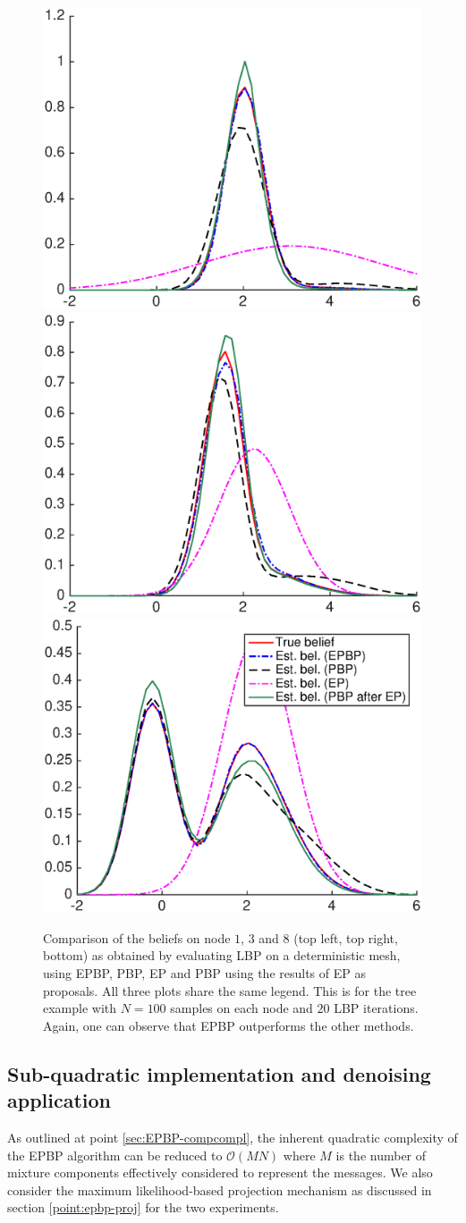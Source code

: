 \begin{figure}[!h]
\center
	\includegraphics[width=.48\textwidth]{figures/epbp/tree_node1}
	\includegraphics[width=.48\textwidth]{figures/epbp/tree_node3}
	\includegraphics[width=.48\textwidth]{figures/epbp/tree_node8}

	\caption{\label{compTree}Comparison of the beliefs on node $1$, $3$ and $8$ (top left, top right, bottom) as obtained by evaluating LBP on a deterministic mesh, using EPBP, PBP, EP and PBP using the results of EP as proposals. All three plots share the same legend. This is for the tree example with $N=100$ samples on each node and $20$ LBP iterations. Again, one can observe that EPBP outperforms the other methods. }
\end{figure}

\subsection{Sub-quadratic implementation and denoising application}
As outlined at point \ref{sec:EPBP-compcompl}, the inherent quadratic complexity of the EPBP algorithm can be reduced to $\mathcal O(MN)$ where $M$ is the number of mixture components effectively considered to represent the messages. We also consider the maximum likelihood-based projection mechanism as discussed in section \ref{point:epbp-proj} for the two experiments.

